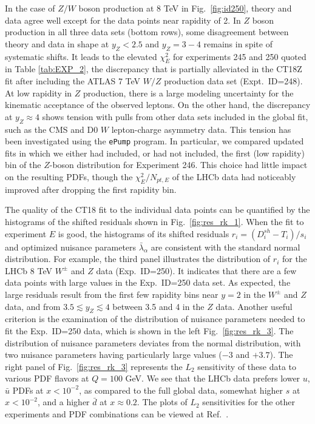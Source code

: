 In the case of $Z/W$ boson production at 8 TeV in Fig.~\ref{fig:id250}, 
theory and data agree well except for the data points near rapidity of 2. 
In $Z$ boson production in all three data sets (bottom rows), some disagreement between theory and data in shape at $y_Z <2.5$ and $y_Z=3-4$ remains in spite of systematic shifts. It leads to the  elevated $\chi^2_E$ for experiments 245 and 250 quoted in Table \ref{tab:EXP_2}, the discrepancy that is partially alleviated in the CT18Z fit after including the ATLAS 7 TeV $W/Z$ production data set (Expt.~ID=248).
At low rapidity in $Z$ production, there is a large modeling uncertainty for the kinematic acceptance of the observed leptons. 
On the other hand, the discrepancy at $y_Z\approx 4$ shows tension with pulls from other data sets included in the global fit, 
such as the CMS and D0 $W$ lepton-charge asymmetry data. This tension has been investigated using the \texttt{ePump} program. In particular, we compared updated fits in which we either had included, or had not included, the first (low rapidity) bin of the $Z$-boson distribution for Experiment 246. This choice had little impact on the resulting PDFs, though the $\chi^2_E/N_{pt,E}$ of the LHCb data had noticeably improved after dropping the first rapidity bin. 

The quality of the CT18 fit to the individual data points can be quantified by the histograms of the shifted residuals
shown in Fig.~\ref{fig:res_rk_1}. When the fit to experiment $E$ is good, the histograms of its shifted residuals $r_i\! =\! (D^\mathit{sh}_{i}-T_{i})/s_{i}$  and optimized nuisance parameters $\bar\lambda_\alpha$ are consistent with the standard normal distribution. For example, the third panel  illustrates the distribution of $r_i$ for
the LHCb 8 TeV $W^\pm$ and $Z$ data (Exp.~ID=250). It indicates that there are 
a few data points with large values in the Exp.~ID=250 data set. As expected, the large residuals result from the first 
few rapidity bins near $y=2$ in the $W^\pm$ and $Z$ data, and from $3.5\lesssim y_Z\lesssim 4$ between 3.5 and 4 in the $Z$ data.
Another useful criterion is the examination of the distribution of nuisance parameters needed 
to fit the Exp.~ID=250 data, which is shown in the left Fig.~\ref{fig:res_rk_3}. The distribution of nuisance parameters deviates from the normal distribution, with two nuisance parameters having particularly large values ($-3$ and $+3.7$).
The right panel of Fig.~\ref{fig:res_rk_3} represents 
the $L_2$ sensitivity of these data to various PDF flavors at $Q=100$ GeV. We see that the LHCb data prefers lower $u$, $\bar u$ PDFs at $x<10^{-2}$, as compared to the full global data, somewhat higher $s$ at $x < 10^{-2}$, and a higher $\bar d$ at $x\approx 0.2$. The plots of $L_2$ sensitivities for the other experiments and PDF combinations can be viewed at Ref.~\cite{CT18L2Sensitivity}.

